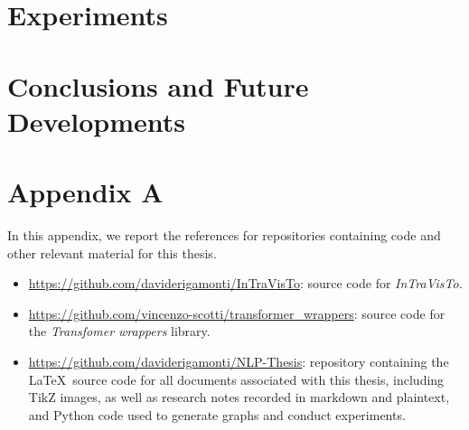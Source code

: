 \documentclass{Configuration_Files/PoliMi3i_thesis}
\begin{document}
\chapter{Experiments}\label{ch:experiments}


\chapter{Conclusions and Future Developments}\label{ch:conclusions}





\cleardoublepage
{} %
\appendix
\chapter{Appendix A}
In this appendix, we report the references for repositories containing code and other relevant material for this thesis.
\begin{itemize}
	\item \url{https://github.com/daviderigamonti/InTraVisTo}: source code for \emph{InTraVisTo}.
	\item \url{https://github.com/vincenzo-scotti/transformer_wrappers}: source code for the \emph{Transfomer wrappers} library.
	\item \url{https://github.com/daviderigamonti/NLP-Thesis}: repository containing the \LaTeX~source code for all documents associated with this thesis, including TikZ images, as well as research notes recorded in markdown and plaintext, and Python code used to generate graphs and conduct experiments.
\end{itemize}


\listoffigures

\listoftables
\end{document}

